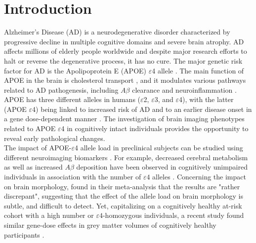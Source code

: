 
\section{Introduction}
\label{sec:introduction}
Alzheimer's Disease (AD) is a neurodegenerative disorder characterized by progressive decline in multiple cognitive domains and severe brain atrophy. AD affects millions of elderly people worldwide \cite{AlzheimersAssociation} and despite major research efforts to halt or reverse the degenerative process, it has no cure. The major genetic risk factor for AD is the Apolipoprotein E (APOE) $\varepsilon$4 allele \cite{Saunders1993}. The main function of APOE in the brain is cholesterol transport \cite{Saunders1993}, and it modulates various pathways related to AD pathogenesis, including $A\beta$ clearance and neuroinflammation \cite{Zhao2018}. APOE has three different alleles in humans ($\varepsilon$2, $\varepsilon$3, and $\varepsilon$4), with the latter (APOE $\varepsilon$4) being linked to increased risk of AD and to an earlier disease onset in a gene dose-dependent manner \cite{Liu2013a}. The investigation of brain imaging phenotypes related to APOE $\varepsilon$4 in cognitively intact individuals provides the opportunity to reveal early pathological changes. \\

The impact of APOE-$\varepsilon$4 allele load in preclinical subjects can be studied using different neuroimaging biomarkers \cite{Chetelat2013}. For example, decreased cerebral metabolism as well as increased $A\beta$ deposition have been observed in cognitively unimpaired individuals in association with the number of $\varepsilon4$ alleles \cite{Reiman2005,Reiman2009}. Concerning the impact on brain morphology, \cite{Fouquet2014} found in their meta-analysis that the results are "rather discrepant", suggesting that the effect of the allele load on brain morphology is subtle, and difficult to detect. Yet, capitalizing on a cognitively healthy at-risk cohort with a high number or $\varepsilon4$-homozygous individuals, a recent study found similar gene-dose effects in grey matter volumes of cognitively healthy participants \cite{Cacciaglia2018}. \\

